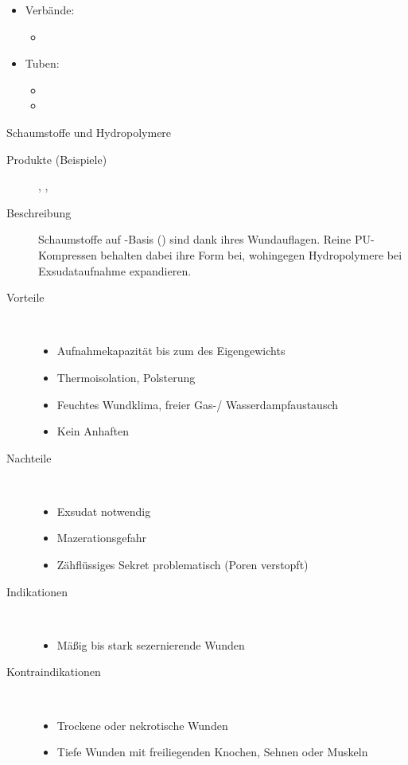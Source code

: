 {
\begin{itemize}
  \item Verbände:
  \begin{itemize}
    \item {}
  \end{itemize}
  \item Tuben:
  \begin{itemize}
    \item {}
    \item {}
  \end{itemize}
\end{itemize}
}
{}
{}
{}





\TextSlide
{Schaumstoffe und Hydropolymere}
{
\begin{description}
  \item[Produkte (Beispiele)] ,
  , 
  \item[Beschreibung] Schaumstoffe auf -Basis
  () sind dank ihres  Wundauflagen. Reine PU-Kompressen
  behalten dabei ihre Form bei, wohingegen Hydropolymere bei
  Exsudataufnahme expandieren. 
  \item[Vorteile] ~
  \begin{itemize}
    \item[$+$] Aufnahmekapazität bis zum
     des Eigengewichts
    \item[$+$] Thermoisolation, Polsterung
    \item[$+$] Feuchtes Wundklima, freier
    Gas-/ Wasserdampfaustausch
    \item[$+$] Kein Anhaften
  \end{itemize}
  \item[Nachteile] ~
  \begin{itemize}
    \item[$\sim$] Exsudat notwendig
    \item[$-$] Mazerationsgefahr
    \item[$-$] Zähflüssiges Sekret problematisch (Poren
    verstopft)
  \end{itemize}
  \item[Indikationen]~
  \begin{itemize}
    \item Mäßig bis stark sezernierende Wunden
  \end{itemize}
  \item[Kontraindikationen] ~
  \begin{itemize}
    \item Trockene oder nekrotische Wunden
    \item Tiefe Wunden mit freiliegenden Knochen, Sehnen
    oder Muskeln
  \end{itemize}
\end{description}
}
